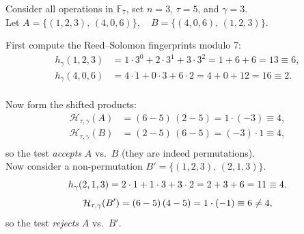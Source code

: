 \documentclass{zkdl-presentation-template}
\begin{document}
    \begin{frame}
        \begin{example}
            Consider all operations in $\mathbb{F}_7$, set $n=3$, $\tau=5$, and $\gamma=3$.\\
            Let $A = \{(1,2,3),\,(4,0,6)\}, \quad B = \{(4,0,6),\,(1,2,3)\}.$
            
            
            \vspace{5px}
            First compute the Reed–Solomon fingerprints modulo 7:
            \vspace{-7px}
            \begin{align*}
                h_{\gamma}(1,2,3) &=1\cdot3^0 + 2\cdot3^1 + 3\cdot3^2 =1 + 6 + 6 =13 \equiv 6,\\
                h_{\gamma}(4,0,6) &=4\cdot1 + 0\cdot3 + 6\cdot2 =4 + 0 + 12 =16 \equiv 2. \\[-23pt]
            \end{align*}
            
            Now form the shifted products:
            \vspace{-7px}
            \begin{align*}
                \mathcal{H}_{\tau,\gamma}(A) &=(6-5)\,(2-5) =1\cdot(-3)\equiv4,\\
                \mathcal{H}_{\tau,\gamma}(B) &=(2-5)\,(6-5) =(-3)\cdot1\equiv4,\\[-23pt]
            \end{align*}
            so the test \emph{accepts} $A$ vs.\ $B$ (they are indeed permutations). \\
            
            
            \vspace{5px}
            Now consider a non-permutation $B' = \{(1,2,3),\,(2,1,3)\}.$
            \vspace{-5px}
            \begin{equation*}
                h_{\gamma}(2,1,3) =2\cdot1 + 1\cdot3 + 3\cdot2 =2 + 3 + 6 =11 \equiv 4.
                \vspace{-10px}
            \end{equation*}
            \begin{equation*}
                \mathcal{H}_{\tau,\gamma}(B') =(6-5)\,(4-5) =1\cdot(-1)\equiv6\neq4,
                \vspace{-5px}
            \end{equation*}
            so the test \emph{rejects} $A$ vs.\ $B'$.  
        \end{example}
    \end{frame}
\end{document}
